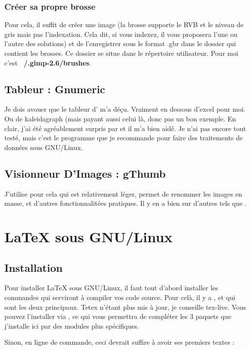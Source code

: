 \documentclass[a4paper,twoside]{article}
\begin{document}
\subsubsection{Créer sa propre brosse}
Pour cela, il suffit de créer une image (la brosse supporte le RVB et le niveau de gris mais pas l'indexation. Cela dit, si vous indexez, il vous proposera l'une ou l'autre des solutions) et de l'enregistrer sous le format .gbr dans le dossier qui contient les brosses. Ce dossier se situe dans le répertoire utilisateur. Pour moi c'est \textbf{~/.gimp-2.6/brushes}.


\subsection{Tableur : Gnumeric}
Je dois avouer que le tableur d' m'a déçu. Vraiment en dessous d'excel pour moi. Ou de kaleidagraph (mais payant aussi celui là, donc pas un bon exemple. En clair, j'ai été agréablement surpris par  et il m'a bien aidé. Je n'ai pas encore tout testé, mais c'est le programme que je recommande pour faire des traitements de données sous GNU/Linux.

\subsection{Visionneur D'Images : gThumb}
J'utilise pour cela  qui est relativement léger, permet de renommer les images en masse, et d'autres fonctionnalitées pratiques. Il y en a bien sur d'autres tels que .

\section{\LaTeX{} sous GNU/Linux}
\subsection{Installation}
Pour installer \LaTeX{} sous GNU/Linux, il faut tout d'abord installer les commandes qui serviront à compiler vos code source. Pour celà, il y a , et  qui sont les deux principaux. Tetex n'étant plus mis à jour, je conseille tex-live. Vous pouvez l'installer via , ce qui vous permettra de compléter les 3 paquets que j'installe ici par des modules plus spécifiques.

Sinon, en ligne de commande, ceci devrait suffire à avoir ses premiers textes :
\end{document}
